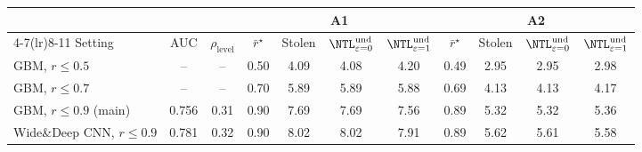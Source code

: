\begin{tabular}{lcccccccccc}
\toprule
 & & & \multicolumn{4}{c}{A1} & \multicolumn{4}{c}{A2} \\
\cmidrule(lr){4-7}\cmidrule(lr){8-11}
Setting & AUC & $\rho_{\mathrm{level}}$ & $\bar r^\star$ & Stolen & $\NTL^{\mathrm{und}}_{\varepsilon=0}$ & $\NTL^{\mathrm{und}}_{\varepsilon=1}$ & $\bar r^\star$ & Stolen & $\NTL^{\mathrm{und}}_{\varepsilon=0}$ & $\NTL^{\mathrm{und}}_{\varepsilon=1}$ \\
\midrule
GBM, $r\le0.5$ & -- & -- & 0.50 & 4.09 & 4.08 & 4.20 & 0.49 & 2.95 & 2.95 & 2.98 \\
GBM, $r\le0.7$ & -- & -- & 0.70 & 5.89 & 5.89 & 5.88 & 0.69 & 4.13 & 4.13 & 4.17 \\
GBM, $r\le0.9$ (main) & 0.756 & 0.31 & 0.90 & 7.69 & 7.69 & 7.56 & 0.89 & 5.32 & 5.32 & 5.36 \\
Wide\&Deep CNN, $r\le0.9$ & 0.781 & 0.32 & 0.90 & 8.02 & 8.02 & 7.91 & 0.89 & 5.62 & 5.61 & 5.58 \\
\bottomrule
\end{tabular}
